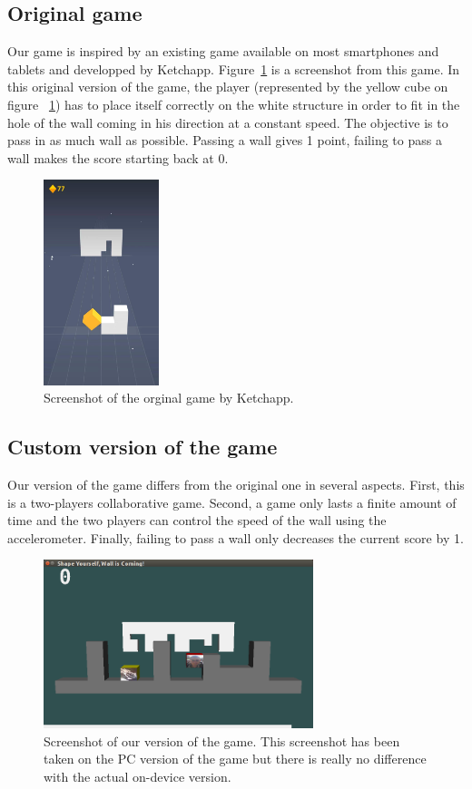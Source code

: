 \documentclass[english, DIV=13]{scrartcl}
\begin{document}
\subsection{Original game}
Our game is inspired by an existing game available on most smartphones and tablets
and developped by Ketchapp. Figure~\ref{fig:original-game} is a screenshot from this game.
In this original version of the game, the player (represented by the yellow cube on figure
~\ref{fig:original-game}) has to place itself correctly on the white structure in order
to fit in the hole of the wall coming in his direction at a constant speed. The objective
is to pass in as much wall as possible. Passing a wall gives 1 point, failing to pass a
wall makes the score starting back at 0.

\begin{figure}
    \centering
    \includegraphics[width=0.3\textwidth]{img/original-game}
    \caption{Screenshot of the orginal game by Ketchapp.}
    \label{fig:original-game}
\end{figure}

\subsection{Custom version of the game}
Our version of the game differs from the original one in several aspects. First, this
is a two-players collaborative game. Second, a game only lasts a finite amount of time
and the two players can control the speed of the wall using the accelerometer.
Finally, failing to pass a wall only decreases the current score by 1. 

\begin{figure}
    \centering
    \includegraphics[width=0.7\textwidth]{img/custom-game-version}
    \caption{Screenshot of our version of the game. This screenshot has been taken
    on the PC version of the game but there is really no difference with the actual
    on-device version.}
    \label{fig:custom-game}
\end{figure}
\end{document}
